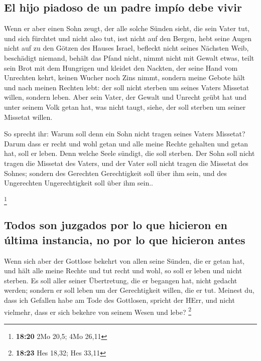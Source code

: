 \hypertarget{el-hijo-piadoso-de-un-padre-impuxedo-debe-vivir}{%
\subsection{El hijo piadoso de un padre impío debe
vivir}\label{el-hijo-piadoso-de-un-padre-impuxedo-debe-vivir}}

 Wenn er aber einen Sohn zeugt, der alle solche Sünden
sieht, die sein Vater tut, und sich fürchtet und nicht also tut,
 isst nicht auf den Bergen, hebt seine Augen nicht auf zu
den Götzen des Hauses Israel, befleckt nicht seines Nächsten Weib,
 beschädigt niemand, behält das Pfand nicht, nimmt nicht
mit Gewalt etwas, teilt sein Brot mit dem Hungrigen und kleidet den
Nackten,  der seine Hand vom Unrechten kehrt, keinen
Wucher noch Zins nimmt, sondern meine Gebote hält und nach meinen
Rechten lebt: der soll nicht sterben um seines Vaters Missetat willen,
sondern leben.  Aber sein Vater, der Gewalt und Unrecht
geübt hat und unter seinem Volk getan hat, was nicht taugt, siehe, der
soll sterben um seiner Missetat willen.

 So sprecht ihr: Warum soll denn ein Sohn nicht tragen
seines Vaters Missetat? Darum dass er recht und wohl getan und alle
meine Rechte gehalten und getan hat, soll er leben.  Denn
welche Seele sündigt, die soll sterben. Der Sohn soll nicht tragen die
Missetat des Vaters, und der Vater soll nicht tragen die Missetat des
Sohnes; sondern des Gerechten Gerechtigkeit soll über ihm sein, und des
Ungerechten Ungerechtigkeit soll über ihm sein..

\footnote{\textbf{18:20} 2Mo 20,5; 4Mo 26,11}

\hypertarget{todos-son-juzgados-por-lo-que-hicieron-en-uxfaltima-instancia-no-por-lo-que-hicieron-antes}{%
\subsection{Todos son juzgados por lo que hicieron en última instancia,
no por lo que hicieron
antes}\label{todos-son-juzgados-por-lo-que-hicieron-en-uxfaltima-instancia-no-por-lo-que-hicieron-antes}}

 Wenn sich aber der Gottlose bekehrt von allen seine
Sünden, die er getan hat, und hält alle meine Rechte und tut recht und
wohl, so soll er leben und nicht sterben.  Es soll aller
seiner Übertretung, die er begangen hat, nicht gedacht werden; sondern
er soll leben um der Gerechtigkeit willen, die er tut. 
Meinest du, dass ich Gefallen habe am Tode des Gottlosen, spricht der
HErr, und nicht vielmehr, dass er sich bekehre von seinem Wesen und
lebe? \footnote{\textbf{18:23} Hes 18,32; Hes 33,11}

